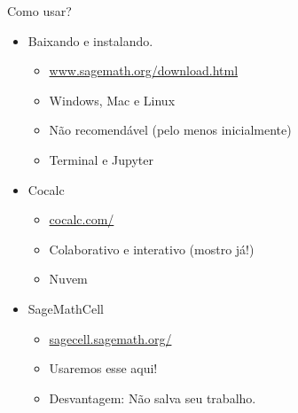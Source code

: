 \documentclass[12pt]{beamer}
\newcommand{\red}[1]{\color{red}#1\color{black}}
\newcommand{\blue}[1]{\color{blue}#1\color{black}}
\begin{document}
\begin{frame}
  {Como usar?}

\begin{itemize}
  \item Baixando e instalando.
  \begin{itemize}
    \item \url{www.sagemath.org/download.html}
    \item Windows, Mac e Linux
    \item \red{Não recomendável (pelo menos inicialmente)}
    \item Terminal e Jupyter
  \end{itemize}
  \item Cocalc
  \begin{itemize}
    \item \url{cocalc.com/}
    \item Colaborativo e interativo (mostro já!)
    \item Nuvem
  \end{itemize}
  \item SageMathCell
  \begin{itemize}
    \item \url{sagecell.sagemath.org/}
    \item \blue{Usaremos esse aqui!}
    \item Desvantagem: Não salva seu trabalho.
  \end{itemize}
\end{itemize}
\end{frame}
\end{document}
